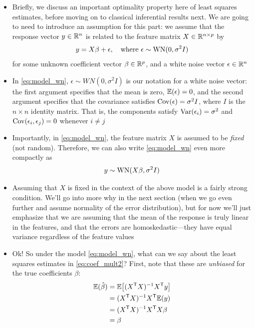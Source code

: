 \documentclass{article}
\begin{document}
\begin{itemize}
\item Briefly, we discuss an important optimality property here of least squares
  estimates, before moving on to classical inferential results next. We are
  going to need to introduce an assumption for this part: we assume that the
  response vector $y \in \mathbb{R}^n$ is related to the feature matrix $X \in \mathbb{R}^{n
    \times p}$ by
  \begin{equation}
  \label{eq:model_wn}
  y = X \beta + \epsilon, \quad \text{where $\epsilon \sim \mathrm{WN}(0, \sigma^2 I)$}   
  \end{equation}
  for some unknown coefficient vector $\beta \in \mathbb{R}^p$, and a white noise vector 
  $\epsilon \in \mathbb{R}^n$

\item In \eqref{eq:model_wn}, $\epsilon \sim WN(0, \sigma^2 I)$ is our notation
  for a white noise vector: the first argument specifies that the mean is zero, 
  $\mathbb{E}(\epsilon) = 0$, and the second argument specifies that the covariance
  satisfies $\operatorname{Cov}(\epsilon) = \sigma^2 I$, where $I$ is the $n \times n$
  identity matrix. That is, the components satisfy $\operatorname{Var}(\epsilon_i) = \sigma^2$
  and $\operatorname{Cov}(\epsilon_i, \epsilon_j) = 0$ whenever $i \not= j$

\item Importantly, in \eqref{eq:model_wn}, the feature matrix $X$ is assumed to
  be \emph{fixed} (not random). Therefore, we can also write \eqref{eq:model_wn}
  even more compactly as 
  \[
  y \sim \mathrm{WN}(X \beta, \sigma^2 I)
  \]

\item Assuming that $X$ is fixed in the context of the above model is a fairly
  strong condition. We'll go into more why in the next section (when we go even 
  further and assume normality of the error distribution), but for now we'll
  just emphasize that we are assuming that the mean of the response is truly
  linear in the features, and that the errors are homoskedastic---they have
  equal variance regardless of the feature values 

\item Ok! So under the model \eqref{eq:model_wn}, what can we say about the
  least squares estimates in \eqref{eq:coef_mult2}? First, note that these are 
  \emph{unbiased} for the true coefficients $\beta$:
  \begin{align*}
  \mathbb{E}(\hat{\beta}) &= \mathbb{E} \big[ (X^{\mathsf{T}} X)^{-1} X^{\mathsf{T}} y \big] \\
  &= (X^{\mathsf{T}} X)^{-1} X^{\mathsf{T}} \mathbb{E}(y) \\
  &= (X^{\mathsf{T}} X)^{-1} X^{\mathsf{T}} X \beta \\
  &= \beta
  \end{align*}


\end{itemize}
\end{document}
